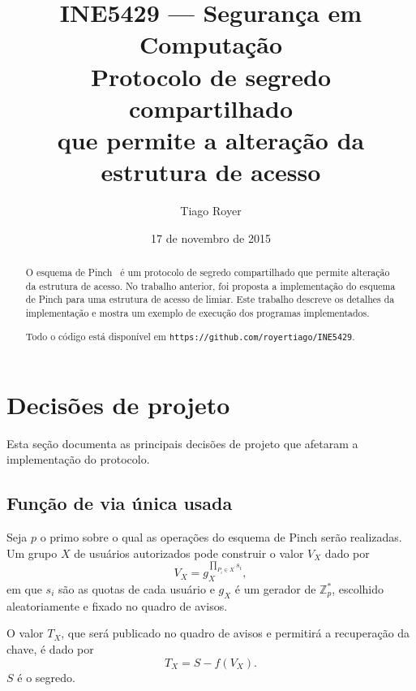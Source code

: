 \documentclass[10pt,twocolumn]{article}
\begin{document}
\title{
    INE5429 --- Segurança em Computação \\[1ex]
    Protocolo de segredo compartilhado \\
    que permite a alteração da estrutura de acesso \\[1ex]
}
\author{Tiago Royer}
\date{17 de novembro de 2015}
\maketitle

\begin{abstract}
    O esquema de Pinch~\cite{Pinch1996}
    é um protocolo de segredo compartilhado
    que permite alteração da estrutura de acesso.
    No trabalho anterior,
    foi proposta a implementação do esquema de Pinch
    para uma estrutura de acesso de limiar.
    Este trabalho descreve os detalhes da implementação
    e mostra um exemplo de execução dos programas implementados.

Todo o código está disponível em \verb"https://github.com/royertiago/INE5429".
\end{abstract}

\section{Decisões de projeto}

Esta seção documenta as principais decisões de projeto
que afetaram a implementação do protocolo.


\subsection{Função de via única usada}

Seja $p$ o primo sobre o qual as operações do esquema de Pinch serão realizadas.
Um grupo $X$ de usuários autorizados pode construir o valor $V_X$ dado por
\begin{equation*}
    V_X = g_X^{\prod_{P_i \in X} s_i},
\end{equation*}
em que $s_i$ são as quotas de cada usuário
e $g_X$ é um gerador de $\mathbb Z_p^*$, escolhido aleatoriamente
e fixado no quadro de avisos.

O valor $T_X$,
que será publicado no quadro de avisos e permitirá a recuperação da chave,
é dado por
\begin{equation*}
    T_X = S - f(V_X).
\end{equation*}
$S$ é o segredo.
\end{document}
